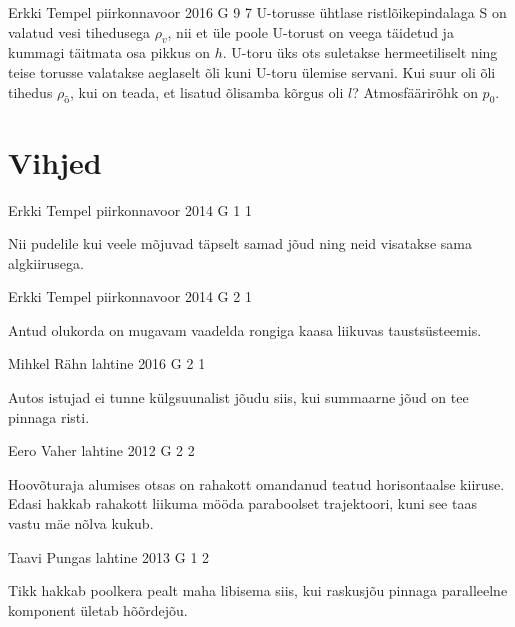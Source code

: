 \documentclass[11pt]{article}
\begin{document}
{%
{Erkki Tempel} %
{piirkonnavoor} %
{2016} %
{G 9} %
{7} %
{
\ifStatement
U-torusse ühtlase ristlõikepindalaga S on valatud vesi tihedusega $\rho_v$, nii et üle poole U-torust on veega täidetud ja kummagi täitmata osa pikkus on $h$. U-toru üks ots suletakse hermeetiliselt ning teise torusse valatakse aeglaselt õli kuni U-toru ülemise servani. Kui suur oli õli tihedus $\rho_{\text{õ}}$, kui on teada, et lisatud õlisamba kõrgus oli $l$? Atmosfäärirõhk on $p_0$.
\fi
}
\newpage\normalsize\section{Vihjed}
        \ToggleHint
        
{Erkki Tempel} %
{piirkonnavoor} %
{2014} %
{G 1} %
{1} %
{

\ifHint
Nii pudelile kui veele mõjuvad täpselt samad jõud ning neid visatakse sama algkiirusega.
\fi
}

{Erkki Tempel} %
{piirkonnavoor} %
{2014} %
{G 2} %
{1} %
{

\ifHint
Antud olukorda on mugavam vaadelda rongiga kaasa liikuvas taustsüsteemis.
\fi
}

{Mihkel Rähn} %
{lahtine} %
{2016} %
{G 2} %
{1} %
{

\ifHint
Autos istujad ei tunne külgsuunalist jõudu siis, kui summaarne jõud on tee pinnaga risti.
\fi
}

{Eero Vaher} %
{lahtine} %
{2012} %
{G 2} %
{2} %
{

\ifHint
Hoovõturaja alumises otsas on rahakott omandanud teatud horisontaalse kiiruse. Edasi hakkab rahakott liikuma mööda paraboolset trajektoori, kuni see taas vastu mäe nõlva kukub.
\fi
}

{Taavi Pungas} %
{lahtine} %
{2013} %
{G 1} %
{2} %
{

\ifHint
Tikk hakkab poolkera pealt maha libisema siis, kui raskusjõu pinnaga paralleelne komponent ületab hõõrdejõu.
\fi
}

}
\end{document}
